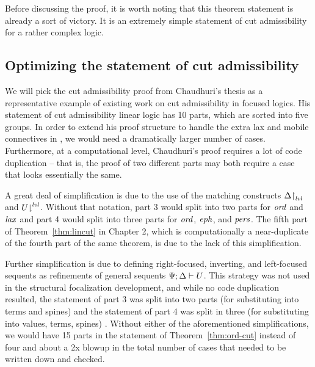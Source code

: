 Before discussing the proof, it is worth noting that this theorem
statement is already a sort of victory. It is an extremely simple
statement of cut admissibility for a rather complex logic.

\subsection{Optimizing the statement of cut admissibility}

We will pick the cut admissibility proof
from Chaudhuri's thesis \cite{chaudhuri06focused} as a representative
example of existing work on cut admissibility in focused logics.  His
statement of cut admissibility linear logic has 10 parts, 
which are sorted into
five groups. In order to extend his
proof structure to handle the extra lax and mobile connectives in
\ollll, we would need a dramatically larger number of
cases. Furthermore, at a computational level, Chaudhuri's proof
requires a lot of code duplication -- that is, the proof of two
different parts may both require a case that looks essentially the
same.

A great deal of simplification is due to the use of the matching
constructs ${\Delta}{\upharpoonright}_{{\it lvl}}$ and
${U}{\downharpoonright}^{{\it lvl}}$. Without that notation, part 3 would split
into two parts for ${\it ord}$ and ${\it lax}$ and part 4 would split into
three parts for ${\it ord}$, ${\it eph}$, and ${\it pers}$. The fifth part of
Theorem~\ref{thm:lincut} in Chapter 2, which is computationally a
near-duplicate of the fourth part of the same theorem, is due to the
lack of this simplification.

Further simplification is due to defining right-focused, inverting,
and left-focused sequents as refinements of general sequents
${\Psi};{\Delta} \vdash {U}$. This strategy was not used in the structural
focalization development, and while no code duplication resulted, the
statement of part 3 was split into two parts (for substituting into
terms and spines) and the statement of part 4 was split in three (for
substituting into values, terms, spines) \cite{simmons11structural}.
Without either of the aforementioned simplifications, we would have 15
parts in the statement of Theorem~\ref{thm:ord-cut} instead of four
and about a 2x blowup in the total number of cases that needed to be
written down and checked.

